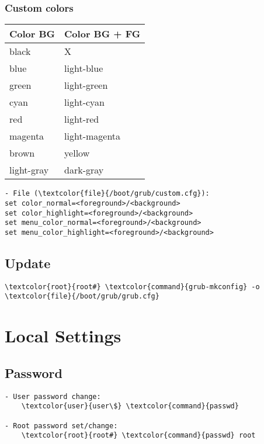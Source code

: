 \documentclass[10pt, a4paper, onecolumn, openany]{book} %
\begin{document}
\subsection{Custom colors}
\begin{center}
    \begin{small}
    \begin{tabular}{|p{4cm}|p{4cm}|}
    \hline
    \textbf{Color BG} & \textbf{Color BG + FG} \\
    \hline
    black & X \\
    \hline
    blue & light-blue \\
    \hline
    green & light-green \\
    \hline
    cyan & light-cyan \\
    \hline
    red & light-red \\
    \hline
    magenta & light-magenta \\
    \hline
    brown & yellow \\
    \hline
    light-gray & dark-gray  \\
    \hline
    \end{tabular}
    \end{small}
\end{center}
\begin{Verbatim}[commandchars=\\\{\}]
- File (\textcolor{file}{/boot/grub/custom.cfg}):
set color_normal=<foreground>/<background>
set color_highlight=<foreground>/<background>
set menu_color_normal=<foreground>/<background>
set menu_color_highlight=<foreground>/<background>
\end{Verbatim}
\section{Update}
\begin{Verbatim}[commandchars=\\\{\}]
    \textcolor{root}{root#} \textcolor{command}{grub-mkconfig} -o \textcolor{file}{/boot/grub/grub.cfg}
\end{Verbatim}


\chapter{Local Settings}
\section{Password}
\begin{Verbatim}[commandchars=\\\{\}]
- User password change:
    \textcolor{user}{user\$} \textcolor{command}{passwd}
   
- Root password set/change: 
    \textcolor{root}{root#} \textcolor{command}{passwd} root
\end{Verbatim}
\end{document}

